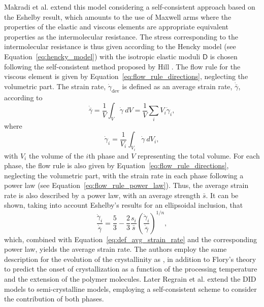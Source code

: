 Makradi et al. \citep{makradiTwophaseSelfconsistentModel2005} extend this model considering a self-consistent approach based on the Eshelby result, which amounts to the use of Maxwell arms where the properties of the elastic and viscous elements are appropriate equivalent properties as the intermolecular resistance.
The stress corresponding to the intermolecular resistance is thus given according to the Hencky model (see Equation~\eqref{eq:hencky_model}) with the isotropic elastic moduli $\bm{\mathsf D}$ is chosen following the self-consistent method proposed by Hill \citep{hillSelfconsistentMechanicsComposite1965}.
The flow rule for the viscous element is given by Equation~\eqref{eq:flow_rule_directions}, neglecting the volumetric part.
The strain rate, $\dot \gamma_\text{dev}$ is defined as an average strain rate, $\dot{\bar\gamma}$, according to
\begin{equation}
	\label{eq:def_avg_strain_rate}
	\dot{\bar\gamma} = \frac{1}{V}\int_V \dot \gamma\ dV = \frac{1}{V}\sum_i V_i \dot{\gamma}_i,
\end{equation}
where
\begin{equation}
	\dot \gamma_i = \frac{1}{V_i}\int_{V_i} \dot \gamma\ dV_i,
\end{equation}
with $V_i$ the volume of the $i$th phase and $V$ representing the total volume.
For each phase, the flow rule is also given by Equation~\eqref{eq:flow_rule_directions}, neglecting the volumetric part, with the strain rate in each phase following a power law (see Equation~\eqref{eq:flow_rule_power_law}).
Thus, the average strain rate is also described by a power law, with an average strength $\bar s$.
It can be shown, taking into account Eshelby's results for an ellipsoidal inclusion, that
\begin{equation}
	\frac{\dot \gamma_i}{\dot{\bar \gamma}} = \frac{5}{3} - \frac{2}{3}\frac{s_i}{\bar s} \left(\frac{\dot \gamma_i}{\dot{\bar \gamma}}\right)^{1/n},
\end{equation}
which, combined with Equation~\eqref{eq:def_avg_strain_rate} and the corresponding power law, yields the average strain rate.
The authors employ the same description for the evolution of the crystallinity as \cite{ahziModelingDeformationBehavior2003}, in addition to Flory's theory to predict the onset of crystallization as a function of the processing temperature and the extension of the polymer molecules.
Later Regrain et al. \citep{regrainMultimechanismModelsSemicrystalline2009} extend the DID models to semi-crystalline models, employing a self-consistent scheme to consider the contribution of both phases.

